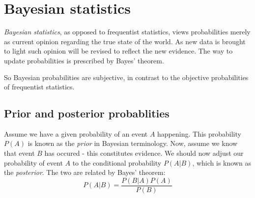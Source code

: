 \documentclass[12pt, a4paper]{article}
\begin{document}
\section{Bayesian statistics}

\textit{Bayesian statistics}, as opposed to frequentist statistics, views probabilities merely as current opinion regarding the true state of the world. As new data is brought to light such opinion will be revised to reflect the new evidence. The way to update probabilities is prescribed by Bayes' theorem.\par
So Bayesian probabilities are subjective, in contrast to the objective probabilities of frequentist statistics.

\subsection{Prior and posterior probablities}
Assume we have a given probability of an event $A$ happening. This probability $P(A)$ is known as the \textit{prior} in Bayesian terminology. Now, assume we know that event $B$ has occured - this constitutes evidence. We should now adjust our probability of event $A$ to the conditional probability $P(A|B)$, which is known as the \textit{posterior}. The two are related by Bayes' theorem:
\begin{equation}
\label{bayes}
P(A|B)=\frac{P(B|A)P(A)}{P(B)}
\end{equation}
\end{document}

